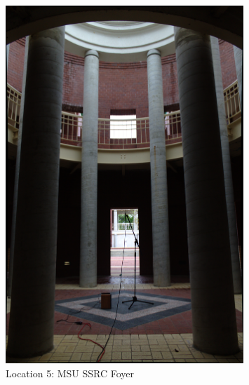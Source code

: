 \documentclass[letterpaper, 11pt, onecolumn, oneside]{article}
\begin{document}
\begin{appendix}
\begin{figure}[h!t]
    \includegraphics[width=0.8\textwidth]{"../Location Photos/SignalWizards_SSRCFoyer"}
    \centering
    \caption{Location 5: MSU SSRC Foyer}
\end{figure}
\end{appendix}

\clearpage


\end{document}
